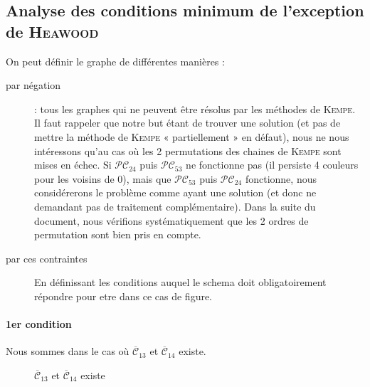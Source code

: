 \documentclass[french]{report}
\begin{document}
\subsection{Analyse des conditions minimum de l'exception de \textsc{Heawood}}
On peut définir le graphe de différentes manières :
\begin{description}
\item [par négation] : tous les graphes qui ne peuvent être résolus par les méthodes de \textsc{Kempe}.
Il faut rappeler que notre but étant de trouver une solution (et pas de mettre la méthode de \textsc{Kempe} « partiellement » en défaut), nous ne nous intéressons qu'au cas où les 2 permutations des chaines de \textsc{Kempe} sont mises en échec. Si $\mathcal{PC}_{24}$ puis $\mathcal{PC}_{53}$ ne fonctionne pas (il persiste 4 couleurs pour les voisins de 0), mais que $\mathcal{PC}_{53}$ puis $\mathcal{PC}_{24}$ fonctionne, nous considérerons le problème comme ayant une solution (et donc ne demandant pas de traitement complémentaire). Dans la suite du document, nous vérifions systématiquement que les 2 ordres de permutation sont bien pris en compte.\\
\item[par ces contraintes]
En définissant les conditions auquel le schema doit obligatoirement répondre pour etre dans ce cas de figure.
\end{description}
\paragraph{1er condition}
Nous sommes dans le cas où $\overline{\mathcal{C}}_{13}$ et $\overline{\mathcal{C}}_{14}$ existe.
\begin{figure}[!ht]\centering
	\begin{changemargin}{-3cm}{-3cm}
		\begin{center}
			
			\caption{$\overline{\mathcal{C}}_{13}$ et $\overline{\mathcal{C}}_{14}$ existe}\label{fig:condition1}
		\end{center}
	\end{changemargin}
\end{figure}
\FloatBarrier
\end{document}
